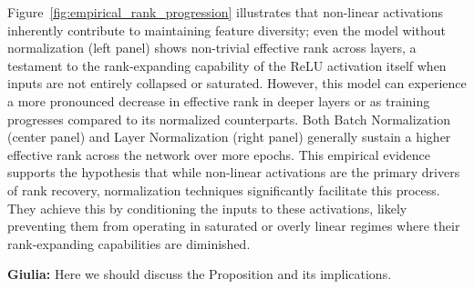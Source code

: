 \documentclass{article}
\newcommand{\giulia}[1]{{\color{ForestGreen}\textbf{Giulia:} #1}}
\begin{document}
Figure~\ref{fig:empirical_rank_progression} illustrates that non-linear activations inherently contribute to maintaining feature diversity; even the model without normalization (left panel) shows non-trivial effective rank across layers, a testament to the rank-expanding capability of the ReLU activation itself when inputs are not entirely collapsed or saturated. However, this model can experience a more pronounced decrease in effective rank in deeper layers or as training progresses compared to its normalized counterparts. Both Batch Normalization (center panel) and Layer Normalization (right panel) generally sustain a higher effective rank across the network over more epochs. This empirical evidence supports the hypothesis that while non-linear activations are the primary drivers of rank recovery, normalization techniques significantly facilitate this process. They achieve this by conditioning the inputs to these activations, likely preventing them from operating in saturated or overly linear regimes where their rank-expanding capabilities are diminished.



\giulia{Here we should discuss the Proposition and its implications. }
\end{document}
